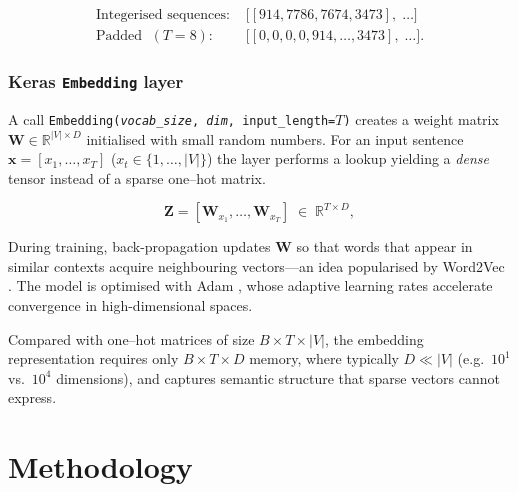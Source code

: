 \documentclass[conference]{IEEEtran}
\begin{document}
\begin{align}
  \text{Integerised sequences: } &
  \bigl[\![914, 7786, 7674, 3473],\; \dots \bigr]
  \label{eq:int_sequences}\\[2pt]
  \text{Padded $\;(T{=}8)$: } &
  \bigl[\![0,0,0,0,914,\dots,3473],\; \dots \bigr].
  \label{eq:padded_sequences}
\end{align}

\subsubsection{Keras \texttt{Embedding} layer}

A call
\texttt{Embedding(\emph{vocab\_size},\,\emph{dim},\,input\_length=$T$)} creates a
weight matrix
\(
  \mathbf{W}\!\in\!\mathbb{R}^{\lvert V\rvert\times D}
\)
initialised with small random numbers.  
For an input sentence $\mathbf{x}=[x_1,\dots,x_T]$ ($x_t\in\{1,\dots,\lvert
V\rvert\}$) the layer performs a lookup yielding a \emph{dense} tensor instead of a sparse one–hot matrix. 

\[
  \mathbf{Z}
  = [\mathbf{W}_{x_1},\dots,\mathbf{W}_{x_T}]
  \;\in\;\mathbb{R}^{T\times D},
  \tag{6}\label{eq:embed_lookup}
\]

\noindent
 


\noindent
During training,
back-propagation updates $\mathbf{W}$ so that words that appear in similar
contexts acquire neighbouring vectors—an idea popularised by Word2Vec
\cite{mikolov2013efficient}.  The model is optimised with Adam \cite{kingma2015adam}, whose adaptive
learning rates accelerate convergence in high-dimensional spaces.

Compared with one–hot matrices of size $B\times T\times\lvert V\rvert$, the
embedding representation requires only $B\times T\times D$ memory, where
typically $D\ll\lvert V\rvert$ (e.g.~$10^{1}$ vs.~$10^{4}$ dimensions), and
captures semantic structure that sparse vectors cannot express.


\section*{Methodology}\label{sec:method}
\end{document}
